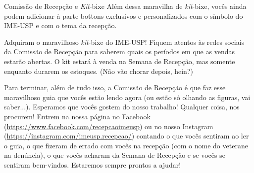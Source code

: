 \begin{secao}{Comissão de Recepção e \textit{Kit}-bixe}
Além dessa maravilha de \textit{kit}-bixe, vocês ainda podem adicionar à parte bottons
exclusivos e personalizados com o símbolo do IME-USP e com o tema da recepção.

Adquiram o maravilhoso \textit{kit}-bixe do IME-USP! Fiquem atentos às redes sociais da
Comissão de Recepção para saberem quais os períodos em que as vendas estarão abertas.
O kit estará à venda na Semana de Recepção, mas somente enquanto
durarem os estoques. (Não vão chorar depois, hein?)

Para terminar, além de tudo isso, a Comissão de Recepção é que faz esse maravilhoso 
guia que vocês estão lendo agora (ou estão só olhando as figuras, vai saber...). 
Esperamos que vocês gostem do nosso trabalho! Qualquer coisa, nos
procurem! Entrem na nossa página no Facebook (\url{https://www.facebook.com/recepcaoimeusp}) 
ou no nosso Instagram (\url{https://instagram.com/imeusp.recepcao/}) contando
o que vocês sentiram ao ler o guia, o que fizeram de errado com vocês na
recepção (com o nome do veterane na denúncia), o que vocês acharam da Semana
de Recepção e se vocês se sentiram bem-vindos. Estaremos sempre prontos a ajudar!
\end{secao}
